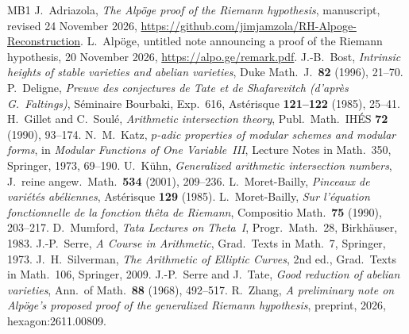 \documentclass[reqno]{amsart}
\theoremstyle{definition}
\theoremstyle{plain}
\begin{document}
\begin{thebibliography}{MB1}
 J.~Adriazola, \emph{The Alp\"oge proof of the Riemann hypothesis}, manuscript, revised 24 November 2026, \url{https://github.com/jimjamzola/RH-Alpoge-Reconstruction}.
 L.~Alp\"oge, untitled note announcing a proof of the Riemann hypothesis, 20 November 2026, \url{https://alpo.ge/remark.pdf}.
 J.-B.~Bost, \emph{Intrinsic heights of stable varieties and abelian varieties}, Duke Math.\ J.\ \textbf{82} (1996), 21--70.
 P.~Deligne, \emph{Preuve des conjectures de Tate et de Shafarevitch (d'apr\`es G.~Faltings)}, S\'eminaire Bourbaki, Exp.~616, Ast\'erisque \textbf{121--122} (1985), 25--41.
 H.~Gillet and C.~Soul\'e, \emph{Arithmetic intersection theory}, Publ.\ Math.\ IH\'ES \textbf{72} (1990), 93--174.
 N.~M.~Katz, \emph{\(p\)-adic properties of modular schemes and modular forms}, in \emph{Modular Functions of One Variable~III}, Lecture Notes in Math.\ 350, Springer, 1973, 69--190.
 U.~K\"uhn, \emph{Generalized arithmetic intersection numbers}, J.\ reine angew.\ Math.\ \textbf{534} (2001), 209--236.
 L.~Moret-Bailly, \emph{Pinceaux de vari\'et\'es ab\'eliennes}, Ast\'erisque \textbf{129} (1985).
 L.~Moret-Bailly, \emph{Sur l'\'equation fonctionnelle de la fonction th\^eta de Riemann}, Compositio Math.\ \textbf{75} (1990), 203--217.
 D.~Mumford, \emph{Tata Lectures on Theta~I}, Progr.\ Math.\ 28, Birkh\"auser, 1983.
 J.-P.~Serre, \emph{A Course in Arithmetic}, Grad.\ Texts in Math.\ 7, Springer, 1973.
 J.~H.~Silverman, \emph{The Arithmetic of Elliptic Curves}, 2nd ed., Grad.\ Texts in Math.\ 106, Springer, 2009.
 J.-P.~Serre and J.~Tate, \emph{Good reduction of abelian varieties}, Ann.\ of Math.\ \textbf{88} (1968), 492--517.
 R.~Zhang, \emph{A preliminary note on Alp\"oge's proposed proof of the generalized Riemann hypothesis}, preprint, 2026, hexagon:2611.00809.
\end{thebibliography}
\end{document}
